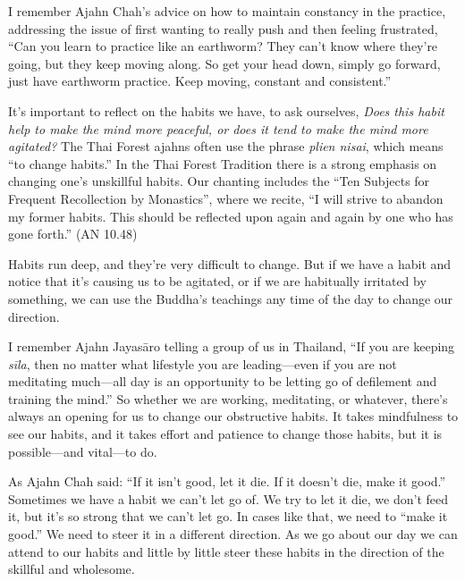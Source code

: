 I remember Ajahn Chah's advice on how to maintain constancy in the 
practice, addressing the issue of first wanting to really push and then 
feeling frustrated, ``Can you learn to practice like an earthworm? They 
can't know where they're going, but they keep moving along. So get your 
head down, simply go forward, just have earthworm practice. Keep 
moving, constant and consistent.''


It's important to reflect on the habits we have, to ask ourselves, 
\emph{Does this habit help to make the mind more peaceful, or does it 
tend to make the mind more agitated?} The Thai Forest ajahns often use 
the phrase \emph{plien nisai}, which means ``to change habits.'' In the 
Thai Forest Tradition there is a strong emphasis on changing one's 
unskillful habits. Our chanting includes the ``Ten Subjects for 
Frequent Recollection by Monastics'', where we recite, ``I will strive 
to abandon my former habits. This should be reflected upon again and 
again by one who has gone forth.'' (AN 10.48)

Habits run deep, and they're very difficult to change. But if we have a 
habit and notice that it's causing us to be agitated, or if we are 
habitually irritated by something, we can use the Buddha's teachings 
any time of the day to change our direction.

I remember Ajahn Jayasāro telling a group of us in Thailand, ``If you 
are keeping \emph{sīla}, then no matter what lifestyle you are 
leading---even if you are not meditating much---all day is an 
opportunity to be letting go of defilement and training the mind.'' So 
whether we are working, meditating, or whatever, there's always an 
opening for us to change our obstructive habits. It takes mindfulness 
to see our habits, and it takes effort and patience to change those 
habits, but it is possible---and vital---to do.

As Ajahn Chah said: ``If it isn't good, let it die. If it doesn't die, 
make it good.'' Sometimes we have a habit we can't let go of. We try to 
let it die, we don't feed it, but it's so strong that we can't let go. 
In cases like that, we need to ``make it good.'' We need to steer it in 
a different direction. As we go about our day we can attend to our 
habits and little by little steer these habits in the direction of the 
skillful and wholesome.


